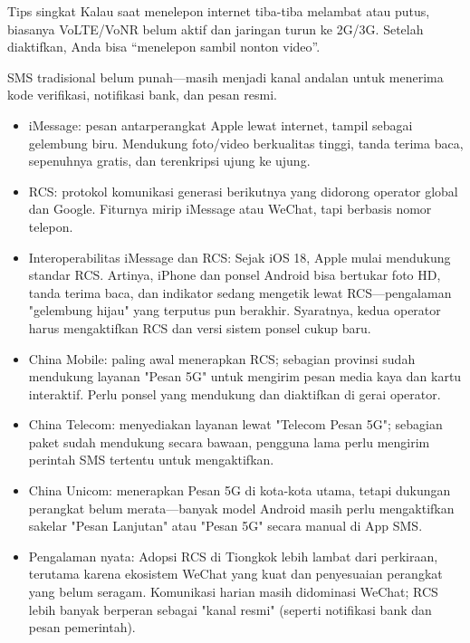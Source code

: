 \begin{tcbinfo}{Tips singkat}
Kalau saat menelepon internet tiba-tiba melambat atau putus, biasanya VoLTE/VoNR belum aktif dan jaringan turun ke 2G/3G. Setelah diaktifkan, Anda bisa “menelepon sambil nonton video”.

\end{tcbinfo}


SMS tradisional belum punah—masih menjadi kanal andalan untuk menerima kode verifikasi, notifikasi bank, dan pesan resmi.

\begin{itemize}
  \item iMessage: pesan antarperangkat Apple lewat internet, tampil sebagai gelembung biru. Mendukung foto/video berkualitas tinggi, tanda terima baca, sepenuhnya gratis, dan terenkripsi ujung ke ujung.
  \item RCS: protokol komunikasi generasi berikutnya yang didorong operator global dan Google. Fiturnya mirip iMessage atau WeChat, tapi berbasis nomor telepon.
  \item Interoperabilitas iMessage dan RCS: Sejak iOS 18, Apple mulai mendukung standar RCS. Artinya, iPhone dan ponsel Android bisa bertukar foto HD, tanda terima baca, dan indikator sedang mengetik lewat RCS—pengalaman "gelembung hijau" yang terputus pun berakhir. Syaratnya, kedua operator harus mengaktifkan RCS dan versi sistem ponsel cukup baru.
\end{itemize}


\begin{itemize}
  \item China Mobile: paling awal menerapkan RCS; sebagian provinsi sudah mendukung layanan "Pesan 5G" untuk mengirim pesan media kaya dan kartu interaktif. Perlu ponsel yang mendukung dan diaktifkan di gerai operator.
  \item China Telecom: menyediakan layanan lewat "Telecom Pesan 5G"; sebagian paket sudah mendukung secara bawaan, pengguna lama perlu mengirim perintah SMS tertentu untuk mengaktifkan.
  \item China Unicom: menerapkan Pesan 5G di kota-kota utama, tetapi dukungan perangkat belum merata—banyak model Android masih perlu mengaktifkan sakelar "Pesan Lanjutan" atau "Pesan 5G" secara manual di App SMS.
  \item Pengalaman nyata: Adopsi RCS di Tiongkok lebih lambat dari perkiraan, terutama karena ekosistem WeChat yang kuat dan penyesuaian perangkat yang belum seragam. Komunikasi harian masih didominasi WeChat; RCS lebih banyak berperan sebagai "kanal resmi" (seperti notifikasi bank dan pesan pemerintah).
\end{itemize}

